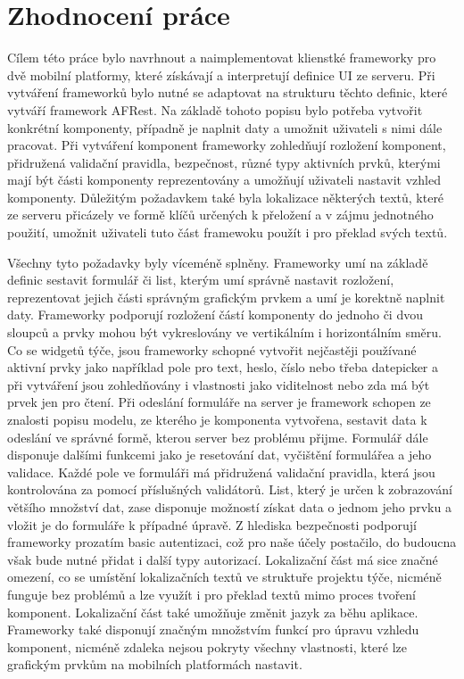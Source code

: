 \section{Zhodnocení práce}
Cílem této práce bylo navrhnout a naimplementovat klienstké frameworky pro dvě mobilní platformy, které získávají a interpretují definice UI ze serveru. Při vytváření frameworků bylo nutné se adaptovat na strukturu těchto definic, které vytváří framework AFRest. Na základě tohoto popisu bylo potřeba vytvořit konkrétní komponenty, případně je naplnit daty a umožnit uživateli s nimi dále pracovat. Při vytváření komponent frameworky zohledňují rozložení komponent, přidružená validační pravidla, bezpečnost, různé typy aktivních prvků, kterými mají být části komponenty reprezentovány a umožňují uživateli nastavit vzhled komponenty. Důležitým požadavkem také byla lokalizace některých textů, které ze serveru přicázely ve formě klíčů určených k přeložení a v zájmu jednotného použití, umožnit uživateli tuto část framewoku použít i pro překlad svých textů. 

Všechny tyto požadavky byly víceméně splněny. Frameworky umí na základě definic sestavit formulář či list, kterým umí správně nastavit rozložení, reprezentovat jejich části správným grafickým prvkem a umí je korektně naplnit daty. Frameworky podporují rozložení částí komponenty do jednoho či dvou sloupců a prvky mohou být vykreslovány ve vertikálním i horizontálním směru. Co se widgetů týče, jsou frameworky schopné vytvořit nejčastěji používané aktivní prvky jako například pole pro text, heslo, číslo nebo třeba datepicker a při vytváření jsou zohledňovány i vlastnosti jako viditelnost nebo zda má být prvek jen pro čtení. Při odeslání formuláře na server je framework schopen ze znalosti popisu modelu, ze kterého je komponenta vytvořena, sestavit data k odeslání ve správné formě, kterou server bez problému přijme. Formulář dále disponuje dalšími funkcemi jako je resetování dat, vyčištění formulářea a jeho validace. Každé pole ve formuláři má přidružená validační pravidla, která jsou kontrolována za pomocí příslušných validátorů. List, který je určen k zobrazování většího množství dat, zase disponuje možností získat data o jednom jeho prvku a vložit je do formuláře k případné úpravě. Z hlediska bezpečnosti podporují frameworky prozatím basic autentizaci, což pro naše účely postačilo, do budoucna však bude nutné přidat i další typy autorizací. Lokalizační část má sice značné omezení, co se umístění lokalizačních textů ve struktuře projektu týče, nicméně funguje bez problémů a lze využít i pro překlad textů mimo proces tvoření komponent. Lokalizační část také umožňuje změnit jazyk za běhu aplikace. Frameworky také disponují značným množstvím funkcí pro úpravu vzhledu komponent, nicméně zdaleka nejsou pokryty všechny vlastnosti, které lze grafickým prvkům na mobilních platformách nastavit.

